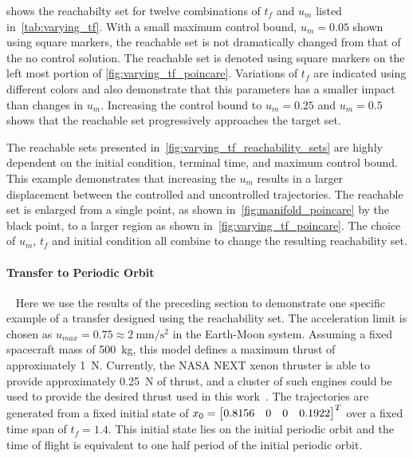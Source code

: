  shows the reachabilty set for twelve combinations of \(t_f\) and \( u_m\) listed in~\cref{tab:varying_tf}.
With a small maximum control bound, \( u_m = \num{0.05} \) shown using square markers, the reachable set is not dramatically changed from that of the no control solution.
The reachable set is denoted using square markers on the left most portion of \cref{fig:varying_tf_poincare}.
Variations of \( t_f\) are indicated using different colors and also demonstrate that this parameters has a smaller impact than changes in \( u_m \).
Increasing the control bound to \( u_m = \num{0.25} \) and \( u_m = \num{0.5} \) shows that the reachable set progressively approaches the target set.

The reachable sets presented in~\cref{fig:varying_tf_reachability_sets} are highly dependent on the initial condition, terminal time, and maximum control bound. 
This example demonstrates that increasing the \( u_m \) results in a larger displacement between the controlled and uncontrolled trajectories.
The reachable set is enlarged from a single point, as shown in~\cref{fig:manifold_poincare} by the black point, to a larger region as shown in~\cref{fig:varying_tf_poincare}.
The choice of \( u_m\), \( t_f \) and initial condition all combine to change the resulting reachability set. 

\paragraph{Transfer to Periodic Orbit}~\label{sssec:periodic_orbit_transfer}
Here we use the results of the preceding section to demonstrate one specific example of a transfer designed using the reachability set.
The acceleration limit is chosen as  \( u_{max} = 0.75 \approx \SI{2}{\milli\meter\per\second\squared} \) in the Earth-Moon system.
Assuming a fixed spacecraft mass of \SI{500}{\kilo\gram}, this model defines a maximum thrust of approximately \SI{1}{\newton}.
Currently, the NASA NEXT xenon thruster is able to provide approximately \SI{0.25}{\newton} of thrust, and a cluster of such engines could be used to provide the desired thrust used in this work~\cite{schmidt2008}.
The trajectories are generated from a fixed initial state of \( x_0 = \begin{bmatrix}0.8156 & 0 & 0 & 0.1922 \end{bmatrix}^T \) over a fixed time span of \( t_f = 1.4 \).
This initial state lies on the initial periodic orbit and the time of flight is equivalent to one half period of the initial periodic orbit. 

